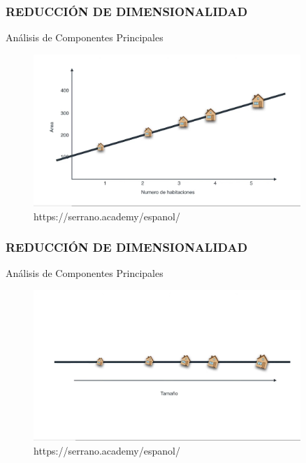 \documentclass{beamer}
\begin{document}
\begin{frame}
	\frametitle{REDUCCIÓN DE DIMENSIONALIDAD}
	\begin{block}{Análisis de Componentes Principales}	
		\begin{figure}
			\includegraphics[width=0.9\textwidth]{PCA/IMG_3539.jpg}
			\caption{https://serrano.academy/espanol/}
		\end{figure}
	\end{block}
\end{frame}

\begin{frame}
	\frametitle{REDUCCIÓN DE DIMENSIONALIDAD}
	\begin{block}{Análisis de Componentes Principales}	
		\begin{figure}
			\includegraphics[width=0.9\textwidth]{PCA/IMG_3540.jpg}
			\caption{https://serrano.academy/espanol/}
		\end{figure}
	\end{block}
\end{frame}
\end{document}
